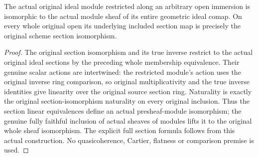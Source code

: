 \begin{lemma}
\label{lem:actual-ideal-open-restriction-module-iso}
\leanok
{}
The actual original ideal module restricted along an arbitrary open
immersion is isomorphic to the actual module sheaf of its entire
geometric ideal comap. On every whole original open its underlying
included section map is precisely the original scheme section isomorphism.
\end{lemma}
\begin{proof}
The original section isomorphism and its true inverse restrict to the
actual original ideal sections by the preceding whole membership
equivalence. Their genuine scalar actions are intertwined: the restricted
module's action uses the original inverse ring comparison, so original
multiplicativity and the true inverse identities give linearity over
the original source section ring. Naturality is exactly the original
section-isomorphism naturality on every original inclusion. Thus the
section linear equivalences define an actual presheaf-module isomorphism;
the genuine fully faithful inclusion of actual sheaves of modules lifts
it to the original whole sheaf isomorphism. The explicit full section
formula follows from this actual construction. No quasicoherence,
Cartier, flatness or comparison premise is used.
\end{proof}


